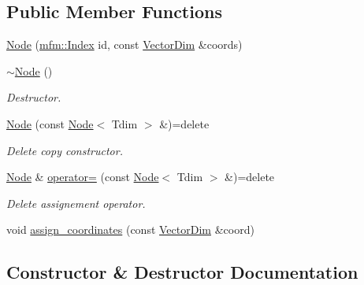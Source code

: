 \subsection*{Public Member Functions}
\begin{DoxyCompactItemize}
\item 
\hyperlink{classmfm_1_1_node_ac5897f6e82a9d032cb22b14d5ac00ab9}{Node} (\hyperlink{namespacemfm_a7d021c8caa1852f673d78358edc6b7f9}{mfm\+::\+Index} id, const \hyperlink{classmfm_1_1_node_a528ae22876ff7f38409424f9db181727}{Vector\+Dim} \&coords)
\item 
\mbox{\label{classmfm_1_1_node_acdfae40a74b72f3016b2f4f6fa9bfa56}} 
\hyperlink{classmfm_1_1_node_acdfae40a74b72f3016b2f4f6fa9bfa56}{$\sim$\+Node} ()
\begin{DoxyCompactList}\small\item\em Destructor. \end{DoxyCompactList}\item 
\mbox{\label{classmfm_1_1_node_a5f37911f78ba13de4e3895b0acb6ac68}} 
\hyperlink{classmfm_1_1_node_a5f37911f78ba13de4e3895b0acb6ac68}{Node} (const \hyperlink{classmfm_1_1_node}{Node}$<$ Tdim $>$ \&)=delete
\begin{DoxyCompactList}\small\item\em Delete copy constructor. \end{DoxyCompactList}\item 
\mbox{\label{classmfm_1_1_node_a61863270265a582ad503cadf99e515ee}} 
\hyperlink{classmfm_1_1_node}{Node} \& \hyperlink{classmfm_1_1_node_a61863270265a582ad503cadf99e515ee}{operator=} (const \hyperlink{classmfm_1_1_node}{Node}$<$ Tdim $>$ \&)=delete
\begin{DoxyCompactList}\small\item\em Delete assignement operator. \end{DoxyCompactList}\item 
void \hyperlink{classmfm_1_1_node_a7744a3637ff17d5443ce965a73a571c2}{assign\+\_\+coordinates} (const \hyperlink{classmfm_1_1_node_a528ae22876ff7f38409424f9db181727}{Vector\+Dim} \&coord)
\end{DoxyCompactItemize}


\subsection{Constructor \& Destructor Documentation}
\mbox{\label{classmfm_1_1_node_ac5897f6e82a9d032cb22b14d5ac00ab9}} 
